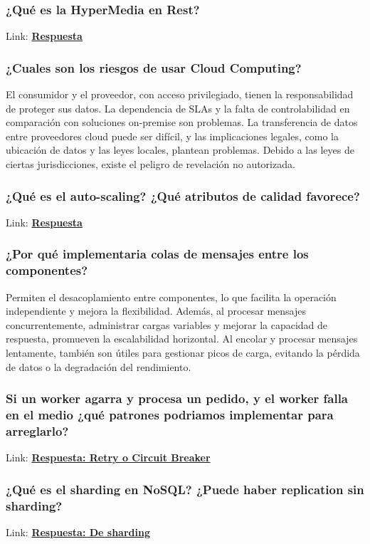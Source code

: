 \documentclass{article}
\begin{document}
  \subsubsection{¿Qué es la HyperMedia en Rest?}
    Link: \textbf{\hyperlink{page.34}{Respuesta}}

    
  \subsubsection{¿Cuales son los riesgos de usar Cloud Computing?}
  El consumidor y el proveedor, con acceso privilegiado, tienen la responsabilidad de proteger sus datos. La dependencia de SLAs y la falta de controlabilidad en comparación con soluciones on-premise son problemas. La transferencia de datos entre proveedores cloud puede ser difícil, y las implicaciones legales, como la ubicación de datos y las leyes locales, plantean problemas. Debido a las leyes de ciertas jurisdicciones, existe el peligro de revelación no autorizada.

  \subsubsection{¿Qué es el auto-scaling? ¿Qué atributos de calidad favorece?}
    Link: \textbf{\hyperlink{page.41}{Respuesta}}

  \subsubsection{¿Por qué implementaria colas de mensajes entre los componentes?}
  
  Permiten el desacoplamiento entre componentes, lo que facilita la operación independiente y mejora la flexibilidad. Además, al procesar mensajes concurrentemente, administrar cargas variables y mejorar la capacidad de respuesta, promueven la escalabilidad horizontal. Al encolar y procesar mensajes lentamente, también son útiles para gestionar picos de carga, evitando la pérdida de datos o la degradación del rendimiento.

  \subsubsection{Si un worker agarra y procesa un pedido, y el worker falla en el medio ¿qué patrones podriamos implementar para arreglarlo?}
  Link: \textbf{\hyperlink{page.43}{Respuesta: Retry o Circuit Breaker}}

  \subsubsection{¿Qué es el sharding en NoSQL? ¿Puede haber replication sin sharding?}
  Link: \textbf{\hyperlink{page.48}{Respuesta: De sharding}} 
\end{document}
